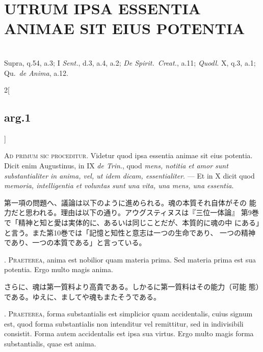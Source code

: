 \documentclass[paper=a4paper,fontsize=10pt,jafontsize=9pt,titlepage]{jlreq}
\begin{document}
\section{UTRUM IPSA ESSENTIA ANIMAE SIT EIUS POTENTIA}
\\
\vspace{1em}
{\footnotesize Supra, q.54, a.3; I {\itshape Sent.}, d.3, a.4, a.2; {\itshape De Spirit.~Creat.}, a.11; {\itshape Quodl.} X, q.3, a.1; Qu.~{\itshape de Anima}, a.12.}\\

\begin{paracol}{2}[\subsection{arg.1}]

{\scshape Ad primum sic proceditur}. Videtur quod ipsa essentia animae
sit eius potentia. Dicit enim Augustinus, in IX {\itshape de Trin}.,
quod {\itshape mens, notitia et amor sunt substantialiter in anima,
vel, ut idem dicam, essentialiter}. --- Et in X dicit quod {\itshape
memoria, intelligentia et voluntas sunt una vita, una mens, una
essentia}.

\switchcolumn

 第一項の問題へ、議論は以下のように進められる。魂の本質それ自体がその
 能力だと思われる。理由は以下の通り。アウグスティヌスは『三位一体論』
 第9巻で「精神と知と愛は実体的に、あるいは同じことだが、本質的に魂の中
 にある」と言う。また第10巻では「記憶と知性と意志は一つの生命であり、
 一つの精神であり、一つの本質である」と言っている。

. {\scshape Praeterea}, anima est nobilior quam materia prima. Sed
materia prima est sua potentia. Ergo multo magis anima.

\switchcolumn

 さらに、魂は第一質料より高貴である。しかるに第一質料はその能力（可能
 態）である。ゆえに、ましてや魂もまたそうである。

. {\scshape Praeterea}, forma substantialis est simplicior quam
accidentalis, cuius signum est, quod forma substantialis non
intenditur vel remittitur, sed in indivisibili consistit. Forma autem
accidentalis est ipsa sua virtus. Ergo multo magis forma
substantialis, quae est anima.


\end{paracol}
\end{document}
